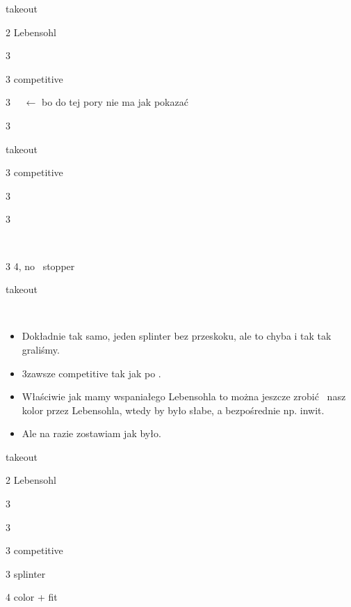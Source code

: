 \documentclass[12pt, a4paper]{article}
\begin{document}
\sequence{{1\diams}{(2\spades)}}
\begin{options}[1]
    \item[\dbl] takeout
    \item[2\nt] Lebensohl
    \item[3\clubs] \then\ \diams\ \invp
    \item[3\diams] competitive
    \item[3\hearts] \nat\ \gf\ $\leftarrow$ bo do tej pory nie ma jak pokazać \hearts\ \imp
    \item[3\spades] \then\ \nt
\end{options}

\sequence{{1\diams}{(3\clubs)}}
\begin{options}[1]
    \item[\dbl] takeout \gf
    \item[3\diams] competitive
    \item[3\hearts] \then\ \spades\ \invp
    \item[3\spades] \then\ \hearts\ \gf
\end{options}

\sequence{{1\diams}{(3\hearts)}}
\begin{options}[1]
    \item[\dbl] \spades\ \invp
    \item[3\spades] 4\spades, no \hearts\ stopper \gf
\end{options}

\sequence{{1\diams}{(3\spades)}}
\begin{options}[1]
    \item[\dbl] takeout \gf
\end{options}

\vspace{2cm}
{\Huge{\hearts}}\\
\begin{itemize}
    \item Dokładnie tak samo, jeden splinter bez przeskoku,
    ale to chyba i tak tak graliśmy.
    \item 3\hearts zawsze competitive tak jak po \diams.
    \item Właściwie jak mamy wspaniałego Lebensohla to można
    jeszcze zrobić \then\ nasz kolor przez Lebensohla,
    wtedy by było słabe, a bezpośrednie np. inwit.
    \item Ale na razie zostawiam jak było.
\end{itemize}

\sequence{{1\hearts}{(2\spades)}}
\begin{options}[1]
    \item[\dbl] takeout
    \item[2\nt] Lebensohl
    \item[3\clubs] \then\ \diams\ \invp
    \item[3\diams] \then\ \hearts\ \invp
    \item[3\hearts] competitive
    \item[3\spades] splinter
    \item[4\minor] color + fit
\end{options}
\end{document}
